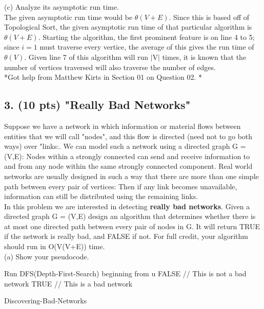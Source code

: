 \documentclass[12pt]{article}
\begin{document}
\linebreak
(c) Analyze its asymptotic run time. \\
\linebreak
The given asymptotic run time would be $\theta(V+E)$. Since this is based off of Topological Sort, the given asymptotic run time of that particular algorithm is $\theta(V+E)$.  Starting the algorithm, the first prominent feature is on line 4 to 5; since $i=1$ must traverse every vertice, the average of this gives the run time of $\theta(V)$. Given line 7 of this algorithm will run $\lvert$V$\rvert$ times, it is known that the number of vertices traversed will also traverse the number of edges. \\
*Got help from Matthew Kirts in Section 01 on Question 02. * \\
\subsection*{3. (10 pts) "Really Bad Networks"}
\linebreak
Suppose we have a network in which information or material flows between entities that we will call "nodes", and this flow is directed (need not to go both ways) over "links:. We can model such a network using a directed graph G = (V,E): Nodes within a strongly connected can send and receive information to and from any node within the same strongly connected component. Real world networks are usually designed in such a way that there are more than one simple path between every pair of vertices: Then if any link becomes unavailable, information can still be distributed using the remaining links. \\
\linebreak
In this problem we are interested in detecting \textbf{really bad networks}. Given a directed graph G = (V,E) design an algorithm that determines whether there is at most one directed path between every pair of nodes in G. It will return TRUE if the network is really bad, and FALSE if not. For full credit, your algorithm should run in O(V(V+E)) time. \\
\linebreak
(a) Show your pseudocode. \\
\linebreak
\begin{algorithm}[H]
\SetAlgoLined
{} 
{
Run DFS(Depth-First-Search) beginning from u \;
{
\Return FALSE  // This is not a bad network \;
}
\EndIf
}
\EndFor
\Return TRUE // This is a bad network\;
 \caption{Discovering-Bad-Networks}
\end{algorithm} \\
\end{document}
